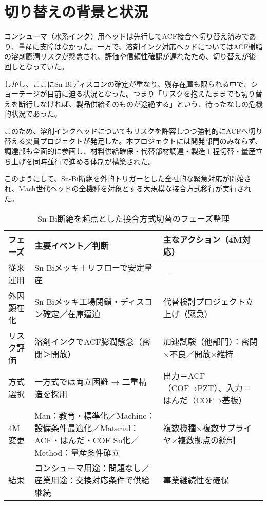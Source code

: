 \documentclass[conference]{IEEEtran}
\begin{document}
\section{切り替えの背景と状況}
コンシューマ（水系インク）用ヘッドは先行してACF接合へ切り替え済みであり、量産に支障はなかった。一方で、溶剤インク対応ヘッドについてはACF樹脂の溶剤膨潤リスクが懸念され、評価や信頼性確認が遅れたため、切り替えが後回しとなっていた。  

しかし、ここにSn-Biディスコンの確定が重なり、残存在庫も限られる中で、ショーテージが目前に迫る状況となった。つまり「リスクを抱えたままでも切り替えを断行しなければ、製品供給そのものが途絶する」という、待ったなしの危機的状況であった。  

このため、溶剤インクヘッドについてもリスクを許容しつつ強制的にACFへ切り替える突貫プロジェクトが発足した。本プロジェクトには開発部門のみならず、調達部も全面的に参画し、材料供給確保・代替部材調達・製造工程切替・量産立ち上げを同時並行で進める体制が構築された。  

このようにして、Sn-Bi断絶を外的トリガーとした全社的な緊急対応が開始され、Mach世代ヘッドの全機種を対象とする大規模な接合方式移行が実行された。

\begin{table}[t]
\centering
\footnotesize
\caption{Sn-Bi断絶を起点とした接合方式切替のフェーズ整理}
\label{tab:flow}
\renewcommand{\arraystretch}{1.1}
\begin{tabularx}{\columnwidth}{@{}p{1.8cm} Y Y@{}}
\toprule
フェーズ & 主要イベント／判断 & 主なアクション（4M対応） \\
\midrule
従来運用 &
Sn-Biメッキ＋リフローで安定量産 &
— \\
\addlinespace[2pt]
外因顕在化 &
Sn-Biメッキ工場閉鎖・ディスコン確定／在庫逼迫 &
代替検討プロジェクト立上げ（緊急） \\
\addlinespace[2pt]
リスク評価 &
溶剤インクでACF膨潤懸念（密閉＞開放） &
加速試験（他部門）：密閉×不良／開放×維持 \\
\addlinespace[2pt]
方式選択 &
一方式では両立困難 → 二重構造を採用 &
出力＝ACF（COF→PZT）、入力＝はんだ（COF→基板） \\
\addlinespace[2pt]
4M変更 &
Man：教育・標準化／Machine：設備条件最適化／Material：ACF・はんだ・COF Sn化／Method：量産条件確立 &
複数機種×複数サプライヤ×複数拠点の統制 \\
\addlinespace[2pt]
結果 &
コンシューマ用途：問題なし／産業用途：交換対応条件で供給継続 &
事業継続性を確保 \\
\bottomrule
\end{tabularx}
\end{table}
\end{document}
